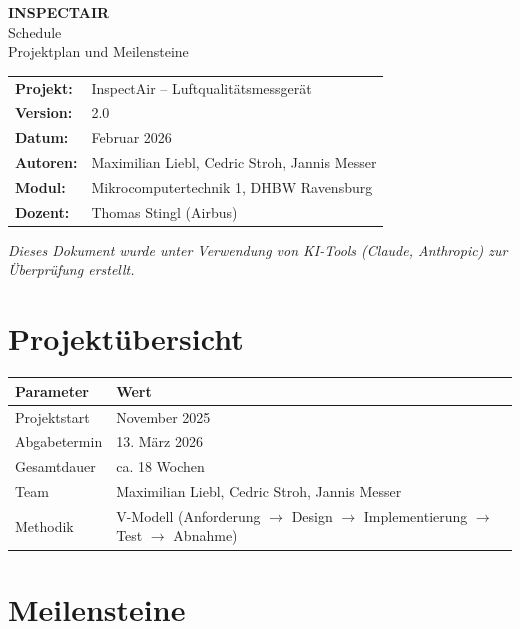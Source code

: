 \documentclass[a4paper,11pt]{article}
\begin{document}
\begin{center}
{\LARGE\textbf{INSPECTAIR}}\\[0.3cm]
{\Large Schedule}\\[0.3cm]
{\large Projektplan und Meilensteine}\\[0.5cm]
\begin{tabular}{ll}
\textbf{Projekt:} & InspectAir -- Luftqualitätsmessgerät \\
\textbf{Version:} & 2.0 \\
\textbf{Datum:} & Februar 2026 \\
\textbf{Autoren:} & Maximilian Liebl, Cedric Stroh, Jannis Messer \\
\textbf{Modul:} & Mikrocomputertechnik 1, DHBW Ravensburg \\
\textbf{Dozent:} & Thomas Stingl (Airbus) \\
\end{tabular}
\end{center}

\vspace{0.5cm}
\noindent\textit{Dieses Dokument wurde unter Verwendung von KI-Tools (Claude, Anthropic) zur Überprüfung erstellt.}
\vspace{0.3cm}

\tableofcontents
\newpage

\section{Projektübersicht}

\begin{tabularx}{\textwidth}{lX}
\toprule
\rowcolor{tableheader}
\textbf{Parameter} & \textbf{Wert} \\
\midrule
Projektstart & November 2025 \\
Abgabetermin & 13. März 2026 \\
Gesamtdauer & ca. 18 Wochen \\
Team & Maximilian Liebl, Cedric Stroh, Jannis Messer \\
Methodik & V-Modell (Anforderung $\to$ Design $\to$ Implementierung $\to$ Test $\to$ Abnahme) \\
\bottomrule
\end{tabularx}

\section{Meilensteine}
\end{document}
